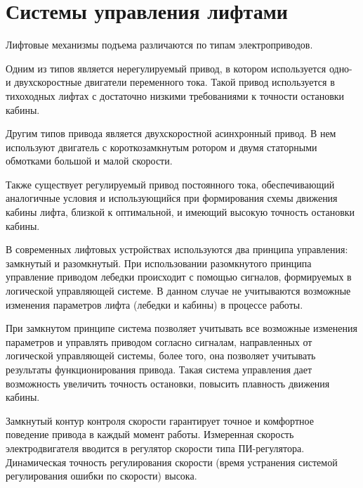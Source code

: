 \section{Системы управления лифтами}

	Лифтовые механизмы подъема различаются по типам электроприводов.

	Одним из типов является нерегулируемый привод, в котором используется одно- и двухскоростные двигатели
		переменного тока. Такой привод используется в тихоходных лифтах с достаточно низкими требованиями
		к точности остановки кабины. 

	Другим типов привода является двухскоростной асинхронный привод.
		В нем используют двигатель с короткозамкнутым ротором и двумя статорными обмотками большой и малой скорости. 

	Также существует регулируемый привод постоянного тока, обеспечивающий аналогичные условия и использующийся
		при формирования схемы движения кабины лифта, близкой к оптимальной, и имеющий высокую точность остановки кабины.

	В современных лифтовых устройствах используются два принципа управления: замкнутый и разомкнутый.
		При использовании разомкнутого принципа управление приводом лебедки происходит с помощью сигналов,
		формируемых в логической управляющей системе. В данном случае не учитываются возможные изменения
		параметров лифта (лебедки и кабины) в процессе работы.

	При замкнутом принципе система позволяет учитывать все возможные изменения параметров и управлять приводом
		согласно сигналам, направленных от логической управляющей системы, более того, она позволяет учитывать
		результаты функционирования привода. Такая система управления дает возможность увеличить точность остановки,
		повысить плавность движения кабины.

    Замкнутый контур контроля скорости гарантирует точное и комфортное поведение привода в каждый момент работы. Измеренная скорость       электродвигателя вводится в регулятор скорости типа ПИ-регулятора. Динамическая точность регулирования скорости (время             устранения системой регулирования ошибки по скорости) высока.
    

